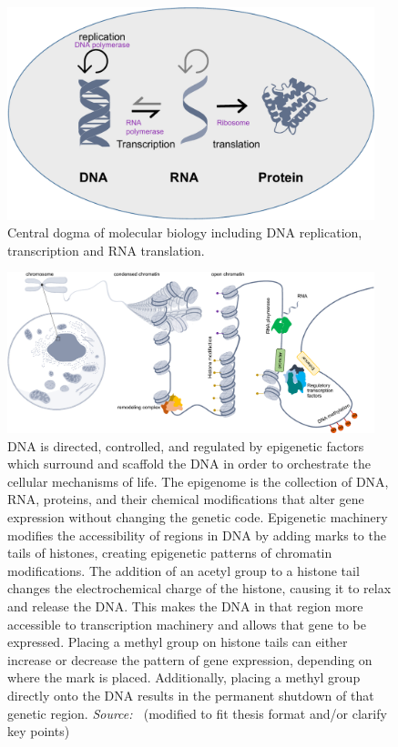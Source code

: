 \begin{figure}[!ht]
	\centering
	\includegraphics[width=0.95\textwidth]{central_dogma/fig}
	\vspace{0.1cm}
	\caption[central dogma.]{Central dogma of molecular biology including DNA replication, transcription and RNA translation.} 
	\label{fig:central_dogma}
\end{figure}



\begin{figure}[!ht]
	\centering
	\includegraphics[width=0.95\textwidth]{chromatin_organization/fig}
	\vspace{0.1cm}
	\caption[DNA organization] {DNA is directed, controlled, and regulated by epigenetic factors which surround and scaffold the DNA in order to orchestrate the cellular mechanisms of life. The epigenome is the collection of DNA, RNA, proteins, and their chemical modifications that alter gene expression without changing the genetic code. Epigenetic machinery modifies the accessibility of regions in DNA by adding marks to the tails of histones, creating epigenetic patterns of chromatin modifications. The addition of an acetyl group to a histone tail changes the electrochemical charge of the histone, causing it to relax and release the DNA. This makes the DNA in that region more accessible to transcription machinery and allows that gene to be expressed. Placing a methyl group on histone tails can either increase or decrease the pattern of gene expression, depending on where the mark is placed. Additionally, placing a methyl group directly onto the DNA results in the permanent shutdown of that genetic region. \emph{Source: ~\citep{heumos2023best}}(modified to fit thesis format and/or clarify key points)}
	\label{fig:chromatin_organization}
\end{figure}


